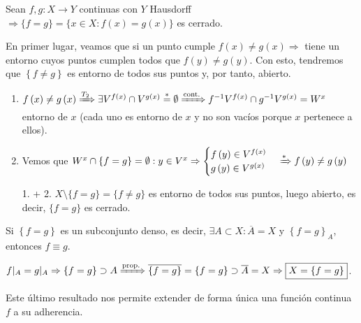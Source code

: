\begin{prop}
Sean $f, g: X \rightarrow Y$ continuas con $Y$ Hausdorff $\Rightarrow \{f = g\} = \{x \in X : f\left( x \right) = g\left( x \right)\}$ es cerrado.
\end{prop}
\begin{demo}
En primer lugar, veamos que si un punto cumple $f\left( x \right) \neq g\left( x \right) \Rightarrow$ tiene un entorno cuyos puntos cumplen todos que $f\left( y \right) \neq g\left( y \right)$. Con esto, tendremos que $\left\{ f \neq g \right\}$ es entorno de todos sus puntos y, por tanto, abierto.
\begin{enumerate}
    \item $f\left( x \right) \neq g\left( x \right) \xRightarrow{T_2} \exists V^{f\left( x \right)} \cap V^{g\left( x \right)} \stackrel{*}{=} \emptyset \xRightarrow{\text{cont.}} f^{-1}V^{f\left( x \right)} \cap g^{-1}V^{g\left( x \right)} = W^x$ entorno de $x$ (cada uno es entorno de $x$ y no son vacíos porque $x$ pertenece a ellos).

    \item Vemos que $W^x \cap \{f = g\} = \emptyset: y \in V^x \Rightarrow \begin{cases}
        f\left( y \right) \in V^{f\left( x \right)} \\
        g\left( y \right) \in V^{g\left( x \right)} 
    \end{cases} \xRightarrow{*} f\left( y \right) \neq g\left( y \right)$

    \item[1. + 2.] $X\setminus \{f = g\} = \{f \neq g\}$ es entorno de todos sus puntos, luego abierto, es decir, $\{f = g\}$ es cerrado.
\end{enumerate}
\end{demo}

\begin{coro}
Si $\left\{ f = g \right\}$ es un subconjunto denso, es decir, $\exists A \subset X: \overline{A} = X$ y $\left\{ f = g \right\}_A$, entonces $f \equiv g$.
\end{coro}
\begin{demo}
$f|_A = g|_A \Rightarrow \{f = g\} \supset A \xRightarrow{\text{prop.}} \overline{\left\{ f = g \right\}} = \{f = g\} \supset \overline{A} = X \Rightarrow \boxed{X = \left\{ f = g \right\}}$.
\end{demo}

\begin{obs}
Este último resultado nos permite extender de forma única una función continua $f$ a su adherencia.
\end{obs}

